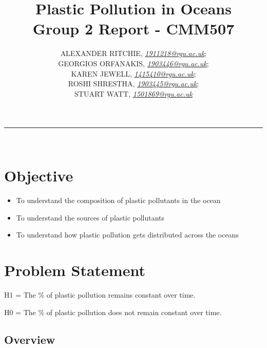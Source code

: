 \documentclass[10pt]{article}\usepackage[]{graphicx}\usepackage[]{color}
\begin{document}
\title{\LARGE Plastic Pollution in Oceans  \\ Group 2 Report - CMM507}

\author{ALEXANDER RITCHIE, \textit{\href{1911218@rgu.ac.uk}{1911218@rgu.ac.uk}};\\ GEORGIOS ORFANAKIS, \textit{\href{1903446@rgu.ac.uk}{1903446@rgu.ac.uk}};\\ KAREN JEWELL, \textit{\href{1415410@rgu.ac.uk}{1415410@rgu.ac.uk}};\\ ROSHI SHRESTHA, \textit{\href{1903445@rgu.ac.uk}{1903445@rgu.ac.uk}};\\ STUART WATT, \textit{\href{1501869@rgu.ac.uk}{1501869@rgu.ac.uk}}}

\maketitle
\noindent\rule{16cm}{0.4pt}
\ \\

\section*{Objective}


\begin{itemize}
\item To understand the composition of plastic pollutants in the ocean
\item To understand the sources of plastic pollutants
\item To understand how plastic pollution gets distributed across the oceans
\end{itemize}

\section{Problem Statement}\label{statement}

H1 = The \% of plastic pollution remains constant over time.

H0 = The \% of plastic pollution does not remain constant over time.




\subsection{Overview}\label{over}
\end{document}
